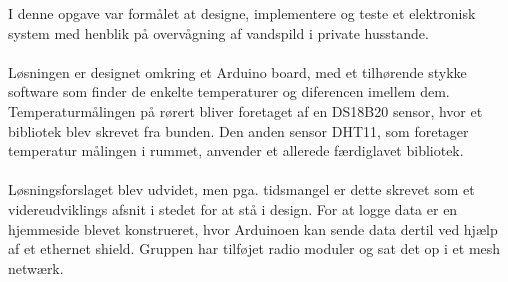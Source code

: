 I denne opgave var formålet at designe, implementere og teste et elektronisk system med henblik på overvågning af vandspild i private husstande.
\\
\\
Løsningen er designet omkring et Arduino board, med et tilhørende stykke software som finder de enkelte temperaturer og diferencen imellem dem. Temperaturmålingen på rørert bliver foretaget af en DS18B20 sensor, hvor et bibliotek blev skrevet fra bunden. Den anden sensor DHT11, som foretager temperatur målingen i rummet, anvender et allerede færdiglavet bibliotek.
\\
\\
Løsningsforslaget blev udvidet, men pga. tidsmangel er dette skrevet som et videreudviklings afsnit i stedet for at stå i design. 
For at logge data er en hjemmeside blevet konstrueret, hvor Arduinoen kan sende data dertil ved hjælp af et ethernet shield.
Gruppen har tilføjet radio moduler og sat det op i  et mesh netwærk.




